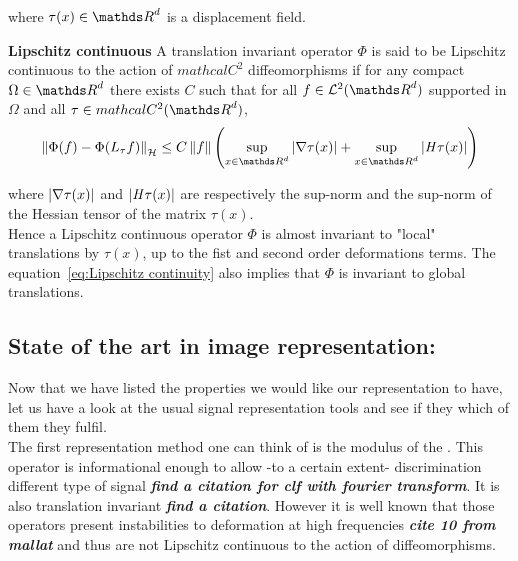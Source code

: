 \documentclass[a4paper,11pt]{report}
\begin{document}
			where $\tau(x) \in \dsR^{d}$ is a displacement field.
			
			\begin{prop} \textbf{Lipschitz continuous}
				A translation invariant operator $\Phi$ is said to be Lipschitz continuous to the action of $mathcal{C}^{2}$ diffeomorphisms if for any compact $\Omega \in \dsR^{d}$ there exists $C$ such that for all $f \in \mathcal{L}^{2}(\dsR^{d})$ supported in $\Omega$ and all $\tau \in mathcal{C}^{2}(\dsR^{d})$,
				\begin{equation}
					\norm{\Phi(f) - \Phi(L_{\tau}f)}_{\mathcal{H}} \leq 
					C \norm{f} \left(\sup_{x \in \dsR^{d}} \abs{\nabla \tau(x)} + \sup_{x \in \dsR^{d}} \abs{\mathit{H}\tau(x)}\right)
					\label{eq:Lipschitz continuity}
				\end{equation}
				\label{pty:Lipschitz continuity - intuition}
			\end{prop}
      
      where $\left| \nabla \tau(x) \right|$ and $\left| \mathit{H}\tau(x) \right|$ are respectively the sup-norm and the sup-norm of the Hessian tensor of the matrix $\tau(x)$.\\
      
      Hence a Lipschitz continuous operator $\Phi$ is almost invariant to "local" translations by $\tau(x)$, up to the fist and second order deformations terms. The equation~\ref{eq:Lipschitz continuity} also implies that $\Phi$ is invariant to global translations.\\

    \subsection{State of the art in image representation:}
      \label{sec:Intro/Image rep/State of the art}      
      
			Now that we have listed the properties we would like our representation to have, let us have a look at the usual signal representation tools and see if they which of them they fulfil.\\
      
			The first representation method one can think of is the modulus of the . This operator is informational enough to allow -to a certain extent- discrimination different type of signal \textbf{\textit{find a citation for clf with fourier transform}}. It is also translation invariant \textbf{\textit{find a citation}}. However it is well known that those operators present instabilities to deformation at high frequencies \textbf{\textit{cite 10 from mallat}} and thus are not Lipschitz continuous to the action of diffeomorphisms.\\
      
\end{document}

